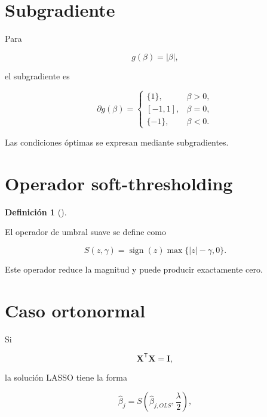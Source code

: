 \documentclass[
  spanish,
  10.5pt,
  letterpaper,
  DIV=11,
  numbers=noendperiod,
  oneside,
  open=any]{scrreprt}
\theoremstyle{definition}
\newtheorem{definition}{Definición}[chapter]
\theoremstyle{definition}
\theoremstyle{plain}
\theoremstyle{remark}
\begin{document}
\section*{Subgradiente}\label{subgradiente}


Para

\[
g(\beta)=|\beta|,
\]

el subgradiente es

\[
\partial g(\beta)
=
\begin{cases}
\{1\}, & \beta>0,\\
[-1,1], & \beta=0,\\
\{-1\}, & \beta<0.
\end{cases}
\]

Las condiciones óptimas se expresan mediante subgradientes.

\section*{Operador soft-thresholding}\label{operador-soft-thresholding}


\begin{definition}[]\protect\hypertarget{def-soft-thresholding}{}\label{def-soft-thresholding}

El operador de umbral suave se define como

\[
S(z,\gamma)
=
\operatorname{sign}(z)
\max
\{
|z|-\gamma,
0
\}.
\]

\end{definition}

Este operador reduce la magnitud y puede producir exactamente cero.

\section*{Caso ortonormal}\label{caso-ortonormal}


Si

\[
\mathbf{X}^{\mathsf T}\mathbf{X}
=
\mathbf{I},
\]

la solución LASSO tiene la forma

\[
\widehat{\beta}_j
=
S
\left(
\widehat{\beta}_{j,OLS},
\frac{\lambda}{2}
\right),
\]
\end{document}
